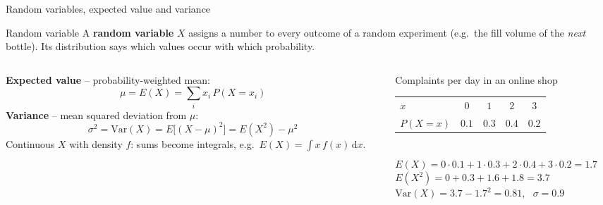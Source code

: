 \documentclass[aspectratio=169,11pt]{beamer}
\begin{document}
\begin{frame}{Random variables, expected value and variance}
  \begin{block}{Random variable}
    A \textbf{random variable} $X$ assigns a number to every outcome of a random
    experiment (e.g.\ the fill volume of the \emph{next} bottle). Its
    distribution says which values occur with which probability.
  \end{block}
  \begin{columns}[T]
    \begin{column}{0.51\textwidth}
      \small
      \textbf{Expected value} -- probability-weighted mean:
      \[ \mu=E(X)=\sum_i x_i\,P(X=x_i) \]
      \textbf{Variance} -- mean squared deviation from $\mu$:
      \[ \sigma^2=\mathrm{Var}(X)=E\bigl[(X-\mu)^2\bigr]=E(X^2)-\mu^2 \]
      {\footnotesize Continuous $X$ with density $f$: sums become integrals,
      e.g.\ $E(X)=\int x\,f(x)\,\mathrm{d}x$.}
    \end{column}
    \begin{column}{0.45\textwidth}
      \begin{exampleblock}{Complaints per day in an online shop}
        \footnotesize
        \begin{tabular}{@{}lcccc@{}}
          $x$        & $0$   & $1$   & $2$   & $3$\\
          $P(X=x)$   & $0.1$ & $0.3$ & $0.4$ & $0.2$
        \end{tabular}\\[4pt]
        $E(X)=0\cdot0.1+1\cdot0.3+2\cdot0.4+3\cdot0.2=\mathbf{1.7}$\\[2pt]
        $E(X^2)=0+0.3+1.6+1.8=3.7$\\[2pt]
        $\mathrm{Var}(X)=3.7-1.7^2=\mathbf{0.81}$, \ $\sigma=\mathbf{0.9}$
      \end{exampleblock}
    \end{column}
  \end{columns}
\end{frame}
\end{document}
